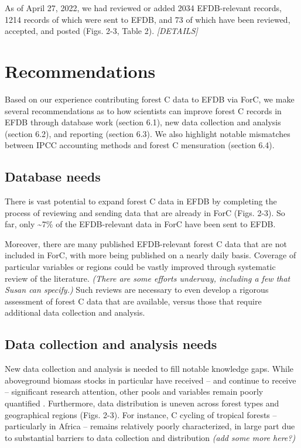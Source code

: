 \documentclass[, manuscript]{copernicus}
\begin{document}
As of April 27, 2022, we had reviewed or added 2034 EFDB-relevant
records, 1214 records of which were sent to EFDB, and 73 of which have
been reviewed, accepted, and posted (Figs. 2-3, Table 2).
\emph{{[}DETAILS{]}}

\section{Recommendations}

Based on our experience contributing forest C data to EFDB via ForC, we
make several recommendations as to how scientists can improve forest C
records in EFDB through database work (section 6.1), new data collection
and analysis (section 6.2), and reporting (section 6.3). We also
highlight notable mismatches between IPCC accounting methods and forest
C mensuration (section 6.4).

\subsection{Database needs}

There is vast potential to expand forest C data in EFDB by completing
the process of reviewing and sending data that are already in ForC
(Figs. 2-3). So far, only \textasciitilde7\% of the EFDB-relevant data
in ForC have been sent to EFDB.

Moreover, there are many published EFDB-relevant forest C data that are
not included in ForC, with more being published on a nearly daily basis.
Coverage of particular variables or regions could be vastly improved
through systematic review of the literature. \emph{(There are some
efforts underway, including a few that Susan can specify.)} Such reviews
are necessary to even develop a rigorous assessment of forest C data
that are available, versus those that require additional data collection
and analysis.

\subsection{Data collection and analysis needs}

New data collection and analysis is needed to fill notable knowledge
gaps. While aboveground biomass stocks in particular have received --
and continue to receive -- significant research attention, other pools
and variables remain poorly quantified \citep[Table
2,][]{anderson-teixeira_carbon_2021}. Furthermore, data distribution is
uneven across forest types and geographical regions (Figs. 2-3). For
instance, C cycling of tropical forests -- particularly in Africa --
remains relatively poorly characterized, in large part due to
substantial barriers to data collection and distribution
\citep{delima_making_2022} \emph{(add some more here?)}
\end{document}
